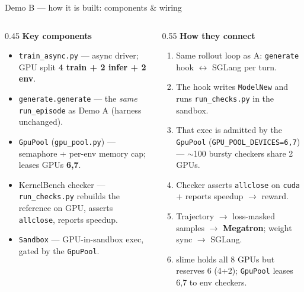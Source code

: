\documentclass[aspectratio=169]{beamer}
\begin{document}
\begin{frame}{Demo B --- how it is built: components \& wiring}
  \begin{columns}[T]
    \begin{column}{0.45\textwidth}
      \scriptsize\textbf{Key components}
      \begin{itemize}\setlength\itemsep{0.15em}
        \item \texttt{train\_async.py} --- async driver; GPU split \textbf{4 train + 2 infer + 2 env}.
        \item \texttt{generate.generate} --- the \emph{same} \texttt{run\_episode} as Demo A (harness unchanged).
        \item \texttt{GpuPool} (\texttt{gpu\_pool.py}) --- semaphore + per-env memory cap; leases GPUs \textbf{6,7}.
        \item KernelBench checker --- \texttt{run\_checks.py} rebuilds the reference on GPU, asserts \texttt{allclose}, reports speedup.
        \item \texttt{Sandbox} --- GPU-in-sandbox exec, gated by the \texttt{GpuPool}.
      \end{itemize}
    \end{column}
    \begin{column}{0.55\textwidth}
      \scriptsize\textbf{How they connect}
      \begin{enumerate}\setlength\itemsep{0.15em}
        \item Same rollout loop as A: \texttt{generate} hook $\leftrightarrow$ SGLang per turn.
        \item The hook writes \texttt{ModelNew} and runs \texttt{run\_checks.py} in the sandbox.
        \item That exec is admitted by the \texttt{GpuPool} (\texttt{GPU\_POOL\_DEVICES=6,7}) --- $\sim$100 bursty checkers share 2 GPUs.
        \item Checker asserts \texttt{allclose} on \texttt{cuda} + reports speedup $\to$ reward.
        \item Trajectory $\to$ loss-masked samples $\to$ \textbf{Megatron}; weight sync $\to$ SGLang.
        \item slime holds all 8 GPUs but reserves 6 (4+2); \texttt{GpuPool} leases 6,7 to env checkers.
      \end{enumerate}
    \end{column}
  \end{columns}
\end{frame}
\end{document}
